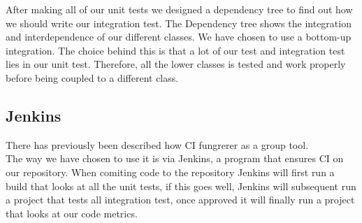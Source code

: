 	\noindent After making all of our unit tests we designed a dependency tree to find out how we should write our integration test. The Dependency tree shows the integration and interdependence of our different classes. We have chosen to use a bottom-up integration. The choice behind this is that a lot of our test and integration test lies in our unit test. Therefore, all the lower classes is tested and work properly before being coupled to a different class.
	
	\subsection{Jenkins}
	There has previously been described how CI fungrerer as a group tool. \\
	The way we have chosen to use it is via Jenkins, a program that ensures CI on our repository. When comiting code to the repository  Jenkins will first run a build that looks at all the unit tests, if this goes well, Jenkins will subsequent run a project that tests all integration test, once approved it will finally run a project that looks at our code metrics.